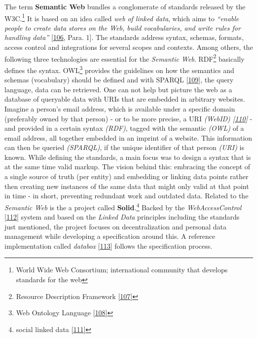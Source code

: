 \documentclass[12pt,english,a4paper,titlepage,cleardoublepage=empty,dottedtoc]{report}
\begin{document}
The term \textbf{\protect\hypertarget{def--semantic-web}{}{Semantic
Web}} bundles a conglomerate of standards released by the W3C.\footnote{World
  Wide Web Consortium; international community that develops standards
  for the web} It is based on an idea called \emph{web of linked data},
which aims to \emph{``enable people to create data stores on the Web,
build vocabularies, and write rules for handling data''}
{[}\protect\hyperlink{ref-web_2016_w3c_semantic-web-activity}{106},
Para. 1{]}. The standards address syntax, schemas, formats, access
control and integrations for several scopes and contexts. Among others,
the following three technologies are essential for the \emph{Semantic
Web}. RDF\footnote{Resource Description Framework
  {[}\protect\hyperlink{ref-web_w3c-tr_rdf}{107}{]}} basically defines
the syntax. OWL\footnote{Web Ontology Language
  {[}\protect\hyperlink{ref-web_w3c-tr_owl}{108}{]}} provides the
guidelines on how the semantics and schemas (vocabulary) should be
defined and with \protect\hypertarget{def--sparql}{}{SPARQL}
{[}\protect\hyperlink{ref-web_w3c-tr_sparql}{109}{]}, the query
language, data can be retrieved. One can not help but picture the web as
a database of queryable data with URIs that are embedded in arbitrary
websites. Imagine a person's email address, which is available under a
specific domain (preferably owned by that person) - or to be more
precise, a URI \emph{(WebID)
{[}\protect\hyperlink{ref-web_w3c-draft_webid}{110}{]}} - and provided
in a certain syntax \emph{(RDF)}, tagged with the semantic \emph{(OWL)}
of a email address, all together embedded in an imprint of a website.
This information can then be queried \emph{(SPARQL)}, if the unique
identifier of that person \emph{(URI)} is known. While defining the
standards, a main focus was to design a syntax that is at the same time
valid markup. The vision behind this: embracing the concept of a single
source of truth (per entity) and embedding or linking data points rather
then creating new instances of the same data that might only valid at
that point in time - in short, preventing redundant work and outdated
data. Related to the \emph{Semantic Web} is the a project called
\textbf{Solid}.\footnote{social linked data
  {[}\protect\hyperlink{ref-web_spec_solid}{111}{]}} Backed by the
\emph{WebAccessControl}
{[}\protect\hyperlink{ref-web_2016_wiki_webaccesscontrol}{112}{]} system
and based on the \emph{Linked Data} principles including the standards
just mentioned, the project focuses on decentralization and personal
data management while developing a specification around this. A
reference implementation called \emph{databox}
{[}\protect\hyperlink{ref-web_2016_demo_databox}{113}{]} follows the
specification process.
\end{document}
